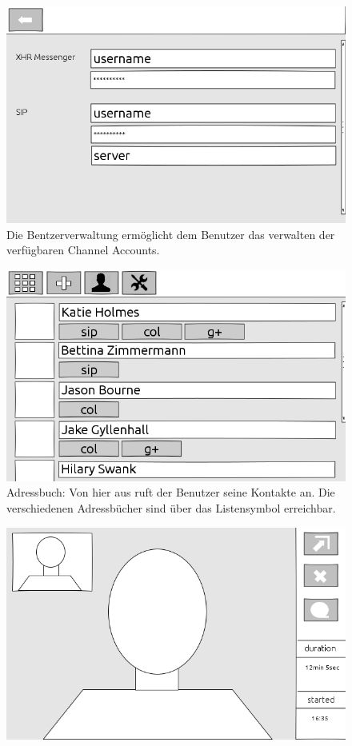 \begin{landscape}
\begin{figure}[H]
		\includegraphics[height=0.6\textwidth]{../ui/img/uiDraft2/UserView-addChannel.png}
		\caption{Die Bentzerverwaltung ermöglicht dem Benutzer das verwalten der verfügbaren Channel Accounts.}
		\label{user management screen}
	\end{figure}
	\begin{figure}[H]
		\centering
		\includegraphics[height=0.6\textwidth]{../ui/img/uiDraft2/ContactbookView.png}
		\caption{Adressbuch: Von hier aus ruft der Benutzer seine Kontakte an. Die verschiedenen Adressbücher sind über das Listensymbol erreichbar.}
		\label{contactbook screen}
	\end{figure}
	\begin{figure}[H]
		\centering
		\includegraphics[height=0.6\textwidth]{../ui/img/uiDraft2/PhoneView.png}

\end{figure}
\end{landscape}
